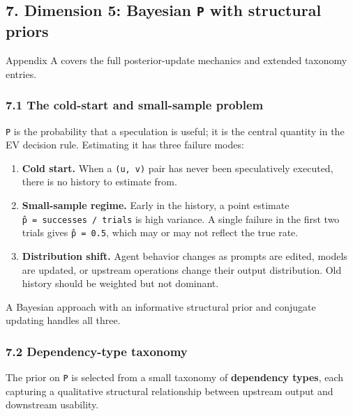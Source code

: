 \documentclass[
  11pt,
]{article}
\providecommand{\tightlist}{%
  \setlength{\itemsep}{0pt}\setlength{\parskip}{0pt}}
\begin{document}
\subsection{\texorpdfstring{7. Dimension 5: Bayesian \texttt{P} with
structural
priors}{7. Dimension 5: Bayesian P with structural priors}}\label{dimension-5-bayesian-p-with-structural-priors}

Appendix A covers the full posterior-update mechanics and extended
taxonomy entries.

\subsubsection{7.1 The cold-start and small-sample
problem}\label{the-cold-start-and-small-sample-problem}

\texttt{P} is the probability that a speculation is useful; it is the
central quantity in the EV decision rule. Estimating it has three
failure modes:

\begin{enumerate}
\def\labelenumi{\arabic{enumi}.}
\tightlist
\item
  \textbf{Cold start.} When a \texttt{(u,\ v)} pair has never been
  speculatively executed, there is no history to estimate from.
\item
  \textbf{Small-sample regime.} Early in the history, a point estimate
  \texttt{p̂\ =\ successes\ /\ trials} is high variance. A single failure
  in the first two trials gives \texttt{p̂\ =\ 0.5}, which may or may not
  reflect the true rate.
\item
  \textbf{Distribution shift.} Agent behavior changes as prompts are
  edited, models are updated, or upstream operations change their output
  distribution. Old history should be weighted but not dominant.
\end{enumerate}

A Bayesian approach with an informative structural prior and conjugate
updating handles all three.

\subsubsection{7.2 Dependency-type
taxonomy}\label{dependency-type-taxonomy}

The prior on \texttt{P} is selected from a small taxonomy of
\textbf{dependency types}, each capturing a qualitative structural
relationship between upstream output and downstream usability.
\end{document}
